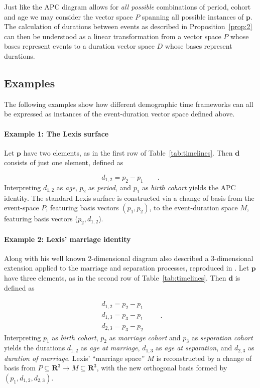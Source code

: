 \documentclass[12pt,oneside,a4paper]{article} %
\theoremstyle{definition}
\begin{document}
Just like the APC diagram allows for \emph{all possible} combinations of period,
cohort and age we may consider the vector space $P$ spanning all possible
instances of $\boldsymbol{p}$. The calculation of durations between events as
described in Proposition~\ref{prop:2} can then be understood as a linear
transformation from a vector space $P$ whose bases represent events to a
duration vector space $D$ whose bases represent durations.

\FloatBarrier
\subsection{Examples}
\label{sec:examples}
The following examples show how different demographic time frameworks can all be expressed as instances of the event-duration vector space defined above.

\paragraph{Example 1: The Lexis surface}

Let $\boldsymbol{p}$ have two elements, as in the first row of
Table~\ref{tab:timelines}. Then $\boldsymbol{d}$ consists of just one element, defined as

\begin{equation}
d_{1,2} = p_2 - p_1   \quad\quad.
\end{equation}
%
Interpreting $d_{1,2}$ as \emph{age}, $p_2$ as \emph{period}, and $p_1$ as
\emph{birth cohort} yields the APC identity. The standard Lexis surface is
constructed via a change of basis from the event-space $P$, featuring basis vectors $(p_1,
p_2)$, to the event-duration space $M$, featuring basis vectors ($p_2, d_{1,2}$).

\paragraph{Example 2: Lexis' marriage identity}

Along with his well known 2-dimensional diagram \citet{lexis1875einleitung} also
described a 3-dimensional extension applied to the marriage and
separation processes, reproduced in \citet{keiding2006event}. Let $\boldsymbol{p}$ have three elements, as in the second row of
Table~\ref{tab:timelines}. Then $\boldsymbol{d}$ is defined as

\begin{equation}
\label{eq:p3}
\begin{matrix}
d_{1,2} = p_2 - p_1\\
d_{1,3} = p_3 - p_1\\
d_{2,3} = p_3 - p_2
\end{matrix} \quad\quad.
\end{equation}
%
Interpreting $p_1$ as \textit{birth cohort}, $p_2$ as \textit{marriage cohort} and $p_3$ as
\textit{separation cohort} yields the durations $d_{1,2}$ as \textit{age at
marriage}, $d_{1,3}$ as \textit{age at separation}, and $d_{2,3}$ as
\textit{duration of marriage}. Lexis' ``marriage space'' $M$ is reconstructed by
a change of basis from $P\subseteq\mathbf{R}^3\to M\subseteq\mathbf{R}^3$, with
the new orthogonal basis formed by $(p_1, d_{1,2}, d_{2,3})$.
\end{document}

